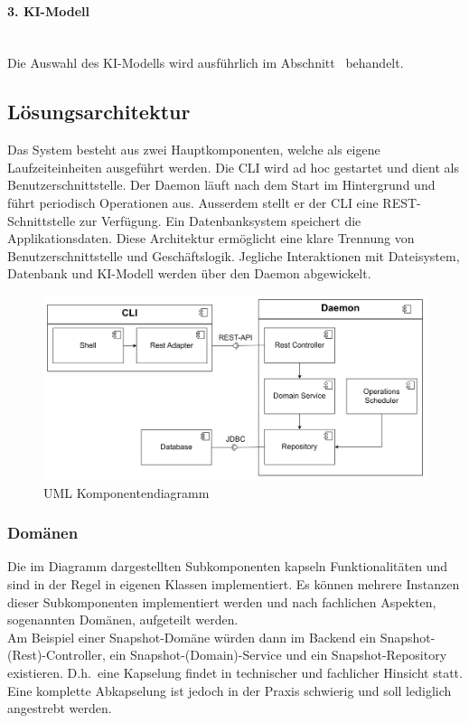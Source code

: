 \documentclass[a4paper,12pt]{report}
\begin{document}
    \paragraph*{3. KI-Modell}\mbox{}\\
    Die Auswahl des KI-Modells wird ausführlich im Abschnitt~ behandelt.
    \clearpage

    \subsection{Lösungsarchitektur}\label{subsec:loesungsarchitektur}

    Das System besteht aus zwei Hauptkomponenten, welche als eigene Laufzeiteinheiten ausgeführt werden.
    Die CLI wird ad hoc gestartet und dient als Benutzerschnittstelle.
    Der Daemon läuft nach dem Start im Hintergrund und führt periodisch Operationen aus.
    Ausserdem stellt er der
    CLI eine REST-Schnittstelle zur Verfügung.
    Ein Datenbanksystem speichert die Applikationsdaten.
    Diese Architektur ermöglicht eine klare Trennung von Benutzerschnittstelle und Geschäftslogik.
    Jegliche Interaktionen mit Dateisystem, Datenbank und KI-Modell werden über den Daemon abgewickelt.

    \begin{figure}[h]
        \centering
        \includegraphics[width=1\textwidth]{assets/comp-diag-tracesentry-v3}
        \caption{UML Komponentendiagramm}
        \label{fig:comp-diag}
        \vspace{2em}
    \end{figure}

    \subsubsection{Domänen}\label{subsubsec:domaenen}
    Die im Diagramm dargestellten Subkomponenten kapseln Funktionalitäten und sind in der Regel in eigenen Klassen implementiert.
    Es können mehrere Instanzen dieser Subkomponenten implementiert werden und nach fachlichen Aspekten, sogenannten Domänen, aufgeteilt werden.
    \\Am Beispiel einer Snapshot-Domäne würden dann im Backend ein Snapshot-(Rest)-Controller, ein Snapshot-(Domain)-Service und ein Snapshot-Repository existieren.
    D.h.\ eine Kapselung findet in technischer und fachlicher Hinsicht statt.
    Eine komplette Abkapselung ist jedoch in der Praxis schwierig und soll lediglich angestrebt werden.\\
\end{document}
